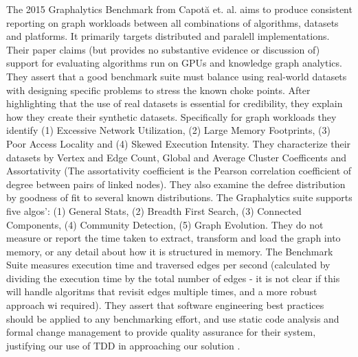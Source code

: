 \documentclass[sigconf,anonymous, authordraft]{acmart}
\begin{document}
\par{The 2015 Graphalytics Benchmark from Capot{\u{a}} et. al. aims to produce consistent reporting on graph workloads between all combinations of algorithms, datasets and platforms. 
It primarily targets distributed and paralell implementations. 
Their paper claims (but provides no substantive evidence or discussion of) support for evaluating algorithms run on GPUs and knowledge graph analytics. 
They assert that a good benchmark suite must balance using real-world datasets with designing specific problems to stress the known choke points. 
After highlighting that the use of real datasets is essential for credibility, they explain how they create their synthetic datasets.
Specifically for graph workloads they identify (1) Excessive Network Utilization, (2) Large Memory Footprints, (3) Poor Access Locality and (4) Skewed Execution Intensity. 
They characterize their datasets by Vertex and Edge Count, Global and Average Cluster Coefficents and Assortativity (The assortativity coefficient is the Pearson correlation coefficient of degree between pairs of linked nodes). 
They also examine the defree distribution by goodness of fit to several known distributions. 
The Graphalytics suite supports five algos': (1) General Stats, (2) Breadth First Search, (3) Connected Components, (4) Community Detection, (5) Graph Evolution. 
They do not measure or report the time taken to extract, transform and load the graph into memory, or any detail about how it is structured in memory. 
The Benchmark Suite measures execution time and traversed edges per second (calculated by dividing the execution time by the total number of edges - it is not clear if this will handle algoritms that revisit edges multiple times, and a more robust approach wi required). 
They assert that software engineering best practices should be applied to any benchmarking effort, and use static code analysis and formal change management to provide quality assurance for their system, justifying our use of TDD in approaching our solution \cite{Capota2015}.}
\end{document}
